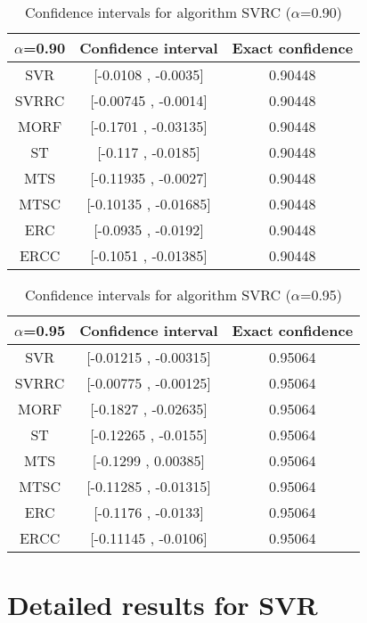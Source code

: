 \documentclass[a4paper,10pt]{article}
\begin{document}
\begin{table}[!htp]
\centering\small
\begin{tabular}{
|c|c|c|}
\hline
 $\alpha$=0.90 & Confidence interval & Exact confidence \\ \hline 
SVR & [-0.0108 , -0.0035] & 0.90448\\ \hline 
SVRRC & [-0.00745 , -0.0014] & 0.90448\\ \hline 
MORF & [-0.1701 , -0.03135] & 0.90448\\ \hline 
ST & [-0.117 , -0.0185] & 0.90448\\ \hline 
MTS & [-0.11935 , -0.0027] & 0.90448\\ \hline 
MTSC & [-0.10135 , -0.01685] & 0.90448\\ \hline 
ERC & [-0.0935 , -0.0192] & 0.90448\\ \hline 
ERCC & [-0.1051 , -0.01385] & 0.90448\\ \hline 

\end{tabular}
\caption{Confidence intervals for algorithm SVRC ($\alpha$=0.90)}
\end{table}
\begin{table}[!htp]
\centering\small
\begin{tabular}{
|c|c|c|}
\hline
 $\alpha$=0.95 & Confidence interval & Exact confidence \\ \hline 
SVR & [-0.01215 , -0.00315] & 0.95064\\ \hline 
SVRRC & [-0.00775 , -0.00125] & 0.95064\\ \hline 
MORF & [-0.1827 , -0.02635] & 0.95064\\ \hline 
ST & [-0.12265 , -0.0155] & 0.95064\\ \hline 
MTS & [-0.1299 , 0.00385] & 0.95064\\ \hline 
MTSC & [-0.11285 , -0.01315] & 0.95064\\ \hline 
ERC & [-0.1176 , -0.0133] & 0.95064\\ \hline 
ERCC & [-0.11145 , -0.0106] & 0.95064\\ \hline 

\end{tabular}
\caption{Confidence intervals for algorithm SVRC ($\alpha$=0.95)}
\end{table}

 \clearpage 


\section{Detailed results for SVR}
\end{document}
